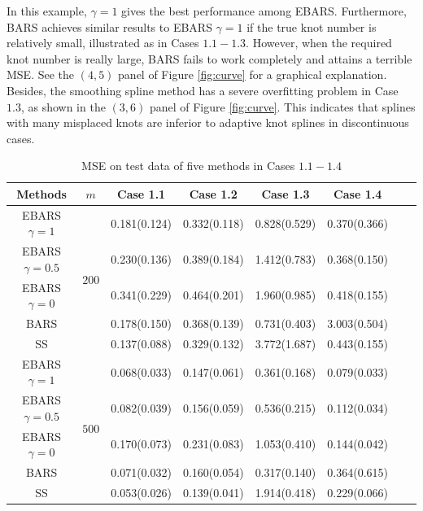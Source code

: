 In this example, $\gamma=1$ gives the best performance among EBARS. Furthermore, BARS achieves similar results to EBARS $\gamma=1$ if the true knot number is relatively small, illustrated as in Cases $1.1-1.3$. However, when the required knot number is really large, BARS fails to work completely and attains a terrible MSE. See the $(4,5)$ panel of Figure \ref{fig:curve} for a graphical explanation. Besides, the smoothing spline method has a severe overfitting problem in Case $1.3$, as shown in the $(3,6)$ panel of Figure \ref{fig:curve}. This indicates that splines with many misplaced knots are inferior to adaptive knot splines in discontinuous cases.

\begin{table}
\caption{MSE on test data of five methods in Cases $1.1-1.4$}
\label{tab:curve}
\centering
\begin{tabular}{cccccccc}
\toprule
       Methods     &   $m$  & Case 1.1     & Case 1.2     & Case 1.3     & Case 1.4     \\ \midrule                               
                 
EBARS $\gamma=1$      & \multirow{5}{*}{$200$}     & 0.181(0.124) & 0.332(0.118) & 0.828(0.529) & 0.370(0.366)  \\
EBARS   $\gamma=0.5$  &       & 0.230(0.136)  & 0.389(0.184) & 1.412(0.783) & 0.368(0.150)  \\
EBARS   $\gamma=0$    &     & 0.341(0.229) & 0.464(0.201) & 1.960(0.985)  & 0.418(0.155) \\
BARS       &      & 0.178(0.150)  & 0.368(0.139) & 0.731(0.403) & 3.003(0.504) \\
SS &  & 0.137(0.088) & 0.329(0.132) & 3.772(1.687) & 0.443(0.155) \\
\midrule
EBARS $\gamma=1$     & \multirow{5}{*}{$500$}     & 0.068(0.033) & 0.147(0.061) & 0.361(0.168) & 0.079(0.033) \\
EBARS     $\gamma=0.5$   &    & 0.082(0.039) & 0.156(0.059) & 0.536(0.215) & 0.112(0.034) \\
EBARS    $\gamma=0$   &     & 0.170(0.073)  & 0.231(0.083) & 1.053(0.410)  & 0.144(0.042) \\
BARS        &     & 0.071(0.032) & 0.160(0.054)  & 0.317(0.140)  & 0.364(0.615) \\
SS & & 0.053(0.026) & 0.139(0.041) & 1.914(0.418) & 0.229(0.066) \\
\bottomrule
\end{tabular}
\end{table}